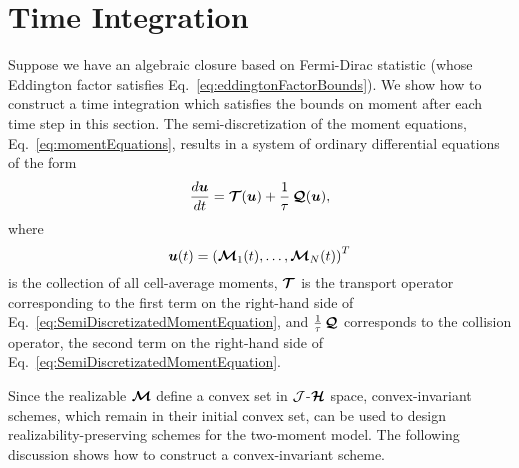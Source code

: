 \section{Time Integration} \label{se:TimeIntegration}

Suppose we have an algebraic closure based on Fermi-Dirac statistic (whose Eddington factor satisfies Eq.~\eqref{eq:eddingtonFactorBounds}).
We show how to construct a time integration which satisfies the bounds on moment after each time step in this section.
The semi-discretization of the moment equations, Eq.~\eqref{eq:momentEquations}, results in a system of ordinary differential equations of the form
\begin{equation}
  \dfrac{d \boldsymbol{u}}{d t} = \boldsymbol{\mathcal{T}}(\boldsymbol{u}) + \frac{1}{\tau}\,\boldsymbol{\mathcal{Q}}(\boldsymbol{u}),
\end{equation}
where
\begin{equation}
\boldsymbol{u}(t) = \left( \boldsymbol{\mathcal{M}}_{1}(t),\ldots,\boldsymbol{\mathcal{M}}_{N}(t)\right) ^{T}
\end{equation}
is the collection of all cell-average moments, $\boldsymbol{\mathcal{T}}$ is the transport operator corresponding to the first term on the right-hand side of Eq.~\eqref{eq:SemiDiscretizatedMomentEquation}, and $\frac{1}{\tau}\,\boldsymbol{\mathcal{Q}}$ corresponds to the collision operator, the second term on the right-hand side of Eq.~\eqref{eq:SemiDiscretizatedMomentEquation}.

Since the realizable $\boldsymbol{\mathcal{M}}$ define a convex set in $\mathcal{J}$-$\boldsymbol{\mathcal{H}}$ space, convex-invariant schemes, which remain in their initial convex set, can be used to design realizability-preserving schemes for the two-moment model. 
The following discussion shows how to construct a convex-invariant scheme.

